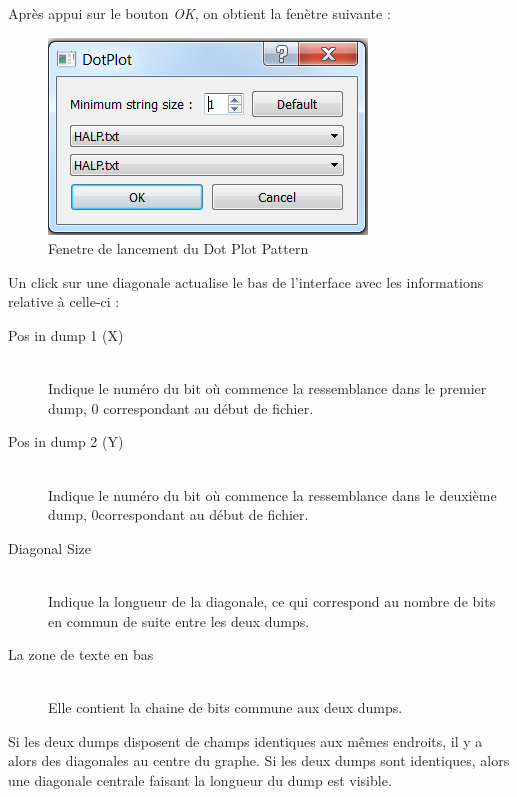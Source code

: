 Après appui sur le bouton \emph{OK}, on obtient la fenètre suivante :
\begin{figure}[!h]
  \begin{center}
  \includegraphics[width=\textwidth]{dotplotdialog.png}
  \caption{Fenetre de lancement du Dot Plot Pattern}
  \label{dotplotdialog}
  \end{center}
\end{figure}

Un click sur une diagonale actualise le bas de l'interface avec les informations relative à celle-ci :
\begin{description}
\item[Pos in dump 1 (X)] \hfill \\
	Indique le numéro du bit où commence la ressemblance dans le premier dump, 0 correspondant au début de fichier.
	
\item[Pos in dump 2 (Y)] \hfill \\
	Indique le numéro du bit où commence la ressemblance dans le deuxième dump, 0correspondant au début de fichier.

\item[Diagonal Size] \hfill \\
	Indique la longueur de la diagonale, ce qui correspond au nombre de bits en commun de suite entre les deux dumps.
	
\item[La zone de texte en bas] \hfill \\
	Elle contient la chaine de bits commune aux deux dumps.

\end{description}

Si les deux dumps disposent de champs identiques aux mêmes endroits, il y a alors des diagonales au centre du graphe. Si les deux dumps sont identiques, alors une diagonale centrale faisant la longueur du dump est visible.